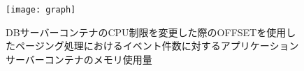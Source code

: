 \documentclass[../../../../../main]{subfiles}
\begin{document}
    \begin{figure}[H]
        \centering
        \texttt{[image: graph]}
        \caption{DBサーバーコンテナのCPU制限を変更した際のOFFSETを使用したページング処理におけるイベント件数に対するアプリケーションサーバーコンテナのメモリ使用量}
        \label{fig:paging-offset-change-db-cpu-limit-app-memory-app_4_8192-db_1024}
    \end{figure}
\end{document}
